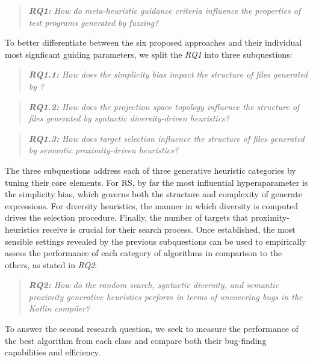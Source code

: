 \begin{quote}
\centering 
\emph{\textbf{RQ1:} How do meta-heuristic guidance
criteria influence the properties of test programs
generated by fuzzing?}
\end{quote}

To better differentiate between the six proposed approaches and their
individual most signficant guiding parameters, we split the \textit{RQ1}
into three subquestions:

\begin{quote}
\centering 
\emph{\textbf{RQ1.1:} How does the simplicity bias
impact the structure of files generated by \kf?}
\end{quote}

\begin{quote}
\centering 
\emph{\textbf{RQ1.2:} How does the projection space
topology influence the structure of files generated
by syntactic diversity-driven heuristics?}
\end{quote}

\begin{quote}
\centering 
\emph{\textbf{RQ1.3:} How does target selection
influence the structure of files generated
by semantic proximity-driven heuristics?}
\end{quote}

The three subquestions address each of three generative
heuristic categories by tuning their core elements.
For \gls{RS}, by far the most influential hyperaparameter is
the simplicity bias, which governs both the structure and complexity of generate expressions.
For diversity heuristics, the manner in which diversity is computed drives the selection procedure.
Finally, the number of targets that proximity-heuristics receive is crucial for their search process.
Once established, the most sensible settings revealed by the previous subquestions can be used
to empirically assess the performance of each category of algorithms in comparison to the others,
as stated in \textit{RQ2}:

\begin{quote}
\centering 
\emph{\textbf{RQ2:} How do the random search, syntactic
diversity, and semantic proximity generative heuristics
perform in terms of uncovering bugs in the Kotlin compiler?}
\end{quote}

To answer the second research question, we seek to measure
the performance of the best algorithm from each class and compare
both their bug-finding capabilities and efficiency.

